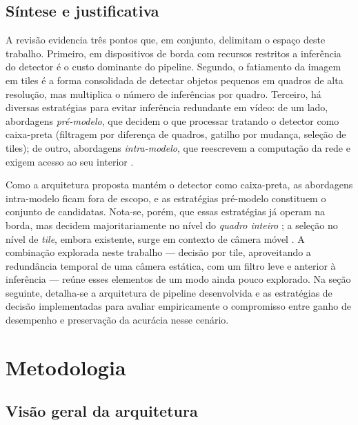 \documentclass{ieeeaccess}
\begin{document}
\subsection{Síntese e justificativa}
\label{subsec:sintese}

A revisão evidencia três pontos que, em conjunto, delimitam o espaço deste
trabalho. Primeiro, em dispositivos de borda com recursos restritos a inferência do detector é o
custo dominante do pipeline. Segundo, o fatiamento da imagem em tiles é a forma
consolidada de detectar objetos pequenos em quadros de alta resolução, mas
multiplica o número de inferências por quadro. Terceiro, há diversas
estratégias para evitar inferência redundante em vídeo: de um lado, abordagens
\textit{pré-modelo}, que decidem o que processar tratando o detector como
caixa-preta (filtragem por diferença de quadros, gatilho por mudança, seleção de
tiles); de outro, abordagens \textit{intra-modelo}, que reescrevem a computação
da rede e exigem acesso ao seu interior \cite{zhu2017dff}.

Como a arquitetura proposta mantém o detector como caixa-preta, as abordagens
intra-modelo ficam fora de escopo, e as estratégias pré-modelo constituem o
conjunto de candidatas. Nota-se, porém, que essas estratégias já operam na borda,
mas decidem majoritariamente no nível do \textit{quadro inteiro}
\cite{li2020reducto, kang2017noscope}; a seleção no nível de \textit{tile},
embora existente, surge em contexto de câmera móvel \cite{plastiras2019selective}.
A combinação explorada neste trabalho --- decisão por tile, aproveitando a redundância
temporal de uma câmera estática, com um filtro leve e anterior à inferência ---
reúne esses elementos de um modo ainda pouco explorado. Na seção seguinte, detalha-se a arquitetura de pipeline desenvolvida e as estratégias de decisão implementadas para avaliar empiricamente o compromisso entre ganho de desempenho e preservação da acurácia nesse cenário.

\section{Metodologia}
\label{sec:metodologia}

\subsection{Visão geral da arquitetura}
\label{subsec:visao_geral}
\end{document}
